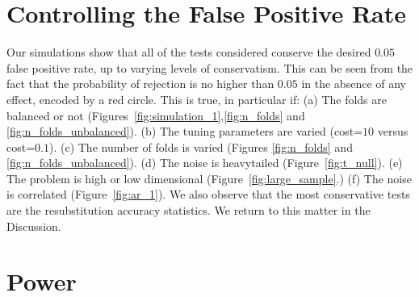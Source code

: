 \documentclass[12pt,a4paper]{article}
\begin{document}
\section{Controlling the False Positive Rate}
\label{sec:type_i}

Our simulations show that all of the tests considered conserve the desired $0.05$ false positive rate, up to varying levels of conservatism.
This can be seen from the fact that the probability of rejection is no higher than $0.05$ in the absence of any effect, encoded by a red circle. 
This is true, in particular if: \newline
(a) The folds are balanced or not (Figures~\ref{fig:simulation_1},\ref{fig:n_folds} and \ref{fig:n_folds_unbalanced}). \newline
(b) The tuning parameters are varied (cost=$10$ versus cost=$0.1$). \newline
(c) The number of folds is varied (Figures \ref{fig:n_folds} and \ref{fig:n_folds_unbalanced}). \newline
(d) The noise is heavytailed (Figure~\ref{fig:t_null}). \newline
(e) The problem is high or low dimensional (Figure~\ref{fig:large_sample}.) \newline
(f) The noise is correlated (Figure~\ref{fig:ar_1}). \newline
We also observe that the most conservative tests are the resubstitution accuracy statistics. 
We return to this matter in the Discussion.







\section{Power}
\label{sec:power}
\end{document}
